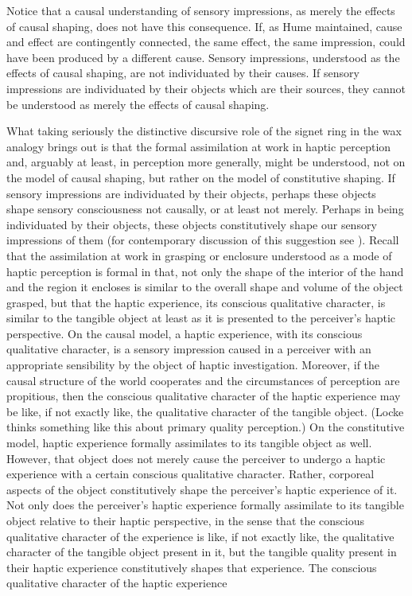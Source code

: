 
Notice that a causal understanding of sensory impressions, as merely the effects of causal shaping, does not have this consequence. If, as Hume maintained, cause and effect are contingently connected, the same effect, the same impression, could have been produced by a different cause. Sensory impressions, understood as the effects of causal shaping, are not individuated by their causes. If sensory impressions are individuated by their objects which are their sources, they cannot be understood as merely the effects of causal shaping. 

What taking seriously the distinctive discursive role of the signet ring in the wax analogy brings out is that the formal assimilation at work in haptic perception and, arguably at least, in perception more generally, might be understood, not on the model of causal shaping, but rather on the model of constitutive shaping. If sensory impressions are individuated by their objects, perhaps these objects shape sensory consciousness not causally, or at least not merely. Perhaps in being individuated by their objects, these objects constitutively shape our sensory impressions of them (for contemporary discussion of this suggestion see \citealt{Kalderon:2008fk,Kalderon:2007mr,Kalderon:2011fk}). Recall that the assimilation at work in grasping or enclosure understood as a mode of haptic perception is formal in that, not only the shape of the interior of the hand and the region it encloses is similar to the overall shape and volume of the object grasped, but that the haptic experience, its conscious qualitative character, is similar to the tangible object at least as it is presented to the perceiver’s haptic perspective. On the causal model, a haptic experience, with its conscious qualitative character, is a sensory impression caused in a perceiver with an appropriate sensibility by the object of haptic investigation. Moreover, if the causal structure of the world cooperates and the circumstances of perception are propitious, then the conscious qualitative character of the haptic experience may be like, if not exactly like, the qualitative character of the tangible object. (Locke thinks something like this about primary quality perception.) On the constitutive model, haptic experience formally assimilates to its tangible object as well. However, that object does not merely cause the perceiver to undergo a haptic experience with a certain conscious qualitative character. Rather, corporeal aspects of the object constitutively shape the perceiver's haptic experience of it. Not only does the perceiver's haptic experience formally assimilate to its tangible object relative to their haptic perspective, in the sense that the conscious qualitative character of the experience is like, if not exactly like, the qualitative character of the tangible object present in it, but the tangible quality present in their haptic experience constitutively shapes that experience. The conscious qualitative character of the haptic experience 